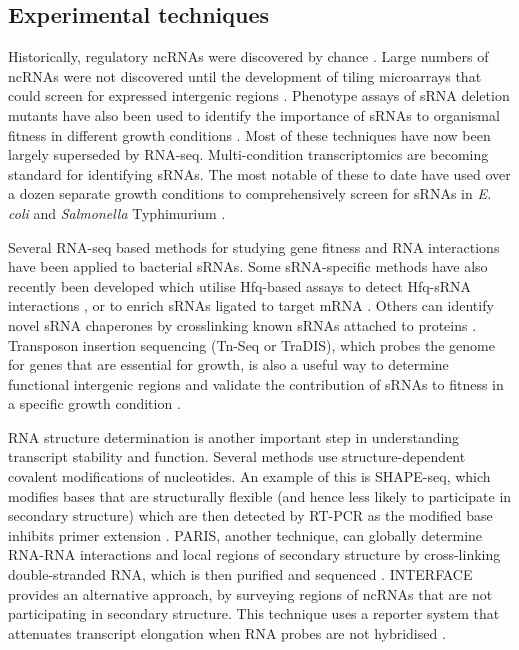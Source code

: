 \subsection{Experimental techniques}
Historically, regulatory ncRNAs were discovered by chance \citep{Thomason2010-ax}. Large numbers of ncRNAs were not discovered until the development of tiling microarrays that could screen for expressed intergenic regions \citep{Gottesman2004-ke}. Phenotype assays of sRNA deletion mutants have also been used to identify the importance of sRNAs to organismal fitness in different growth conditions \citep{Hobbs2010-lj,Santiviago2009-hn}. Most of these techniques have now been largely superseded by RNA-seq. Multi-condition transcriptomics are becoming standard for identifying sRNAs. The most notable of these to date have used over a dozen separate growth conditions to comprehensively screen for sRNAs in \textit{E. coli} \citep{Rau2015-gt} and \textit{Salmonella} Typhimurium \citep{Kroger2013-pg}.\par
Several RNA-seq based methods for studying gene fitness and RNA interactions have been applied to bacterial sRNAs. Some sRNA-specific methods have also recently been developed which utilise Hfq-based assays to detect Hfq-sRNA interactions \citep{Holmqvist2016-xhj}, or to enrich sRNAs ligated to target mRNA \citep{Melamed2016-xv}. Others can identify novel sRNA chaperones by crosslinking known sRNAs attached to proteins \citep{Smirnov2016-yt}. Transposon insertion sequencing (Tn-Seq or TraDIS), which probes the genome for genes that are essential for growth, is also a useful way to determine functional intergenic regions and validate the contribution of sRNAs to fitness in a specific growth condition \citep{Van_Opijnen2009-ns,Barquist2013-ili}. \par  
RNA structure determination is another important step in understanding transcript stability and function. Several methods use structure-dependent covalent modifications of nucleotides. An example of this is SHAPE-seq, which modifies bases that are structurally flexible (and hence less likely to participate in secondary structure) which are then detected by RT-PCR as the modified base inhibits primer extension \citep{Tyrrell2013-ww,Watters2016-dm}. PARIS, another technique, can globally determine RNA-RNA interactions and local regions of secondary structure by cross-linking double-stranded RNA, which is then purified and sequenced \citep{Lu2016-qk}. INTERFACE provides an alternative approach, by surveying regions of ncRNAs that are not participating in secondary structure. This technique uses a reporter system that attenuates transcript elongation when RNA probes are not hybridised \citep{Mihailovic2018-kv}.

